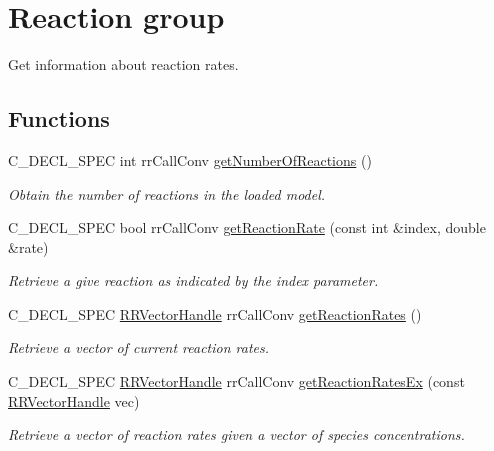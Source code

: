 \hypertarget{group__reaction}{
\section{\-Reaction group}
\label{group__reaction}
}


\-Get information about reaction rates.  


\subsection*{\-Functions}
\begin{DoxyCompactItemize}
\item 
\-C\-\_\-\-D\-E\-C\-L\-\_\-\-S\-P\-E\-C int rr\-Call\-Conv \hyperlink{group__reaction_gae25399f84ff2d1fda619358a1af9a1b5}{get\-Number\-Of\-Reactions} ()
\begin{DoxyCompactList}\small\item\em \-Obtain the number of reactions in the loaded model. \end{DoxyCompactList}\item 
\-C\-\_\-\-D\-E\-C\-L\-\_\-\-S\-P\-E\-C bool rr\-Call\-Conv \hyperlink{group__reaction_gaa2ec2c989a20e15b0fb5cb45b3af2837}{get\-Reaction\-Rate} (const int \&index, double \&rate)
\begin{DoxyCompactList}\small\item\em \-Retrieve a give reaction as indicated by the index parameter. \end{DoxyCompactList}\item 
\-C\-\_\-\-D\-E\-C\-L\-\_\-\-S\-P\-E\-C \hyperlink{rr__c__types_8h_aea46a16752b0ae2cd95c009030ee630e}{\-R\-R\-Vector\-Handle} \*
rr\-Call\-Conv \hyperlink{group__reaction_ga86d544bcf3eeaa4698a60123a3da69aa}{get\-Reaction\-Rates} ()
\begin{DoxyCompactList}\small\item\em \-Retrieve a vector of current reaction rates. \end{DoxyCompactList}\item 
\-C\-\_\-\-D\-E\-C\-L\-\_\-\-S\-P\-E\-C \hyperlink{rr__c__types_8h_aea46a16752b0ae2cd95c009030ee630e}{\-R\-R\-Vector\-Handle} \*
rr\-Call\-Conv \hyperlink{group__reaction_gaa03d9414ddeb177a76365dd5b2d0042e}{get\-Reaction\-Rates\-Ex} (const \hyperlink{rr__c__types_8h_aea46a16752b0ae2cd95c009030ee630e}{\-R\-R\-Vector\-Handle} vec)
\begin{DoxyCompactList}\small\item\em \-Retrieve a vector of reaction rates given a vector of species concentrations. \end{DoxyCompactList}\item 

\end{DoxyCompactItemize}
